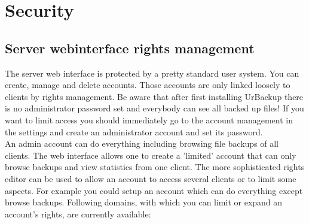 \documentclass[a4paper,10pt]{article}
\begin{document}
\section{Security}
\label{sec_security}

\subsection{Server webinterface rights management}

The server web interface is protected by a pretty standard user system. You can
create, manage and delete accounts. Those accounts are only linked loosely to
clients by rights management. Be aware that after first installing UrBackup
there is no administrator password set and everybody can see all backed up files!
If you want to limit access you should immediately go to the account management
in the settings and create an administrator account and set its password.\\
An admin account can do everything including browsing file backups of all
clients. The web interface allows one to create a 'limited' account that can only
browse backups and view statistics from one client. The more sophisticated
rights editor can be used to allow an account to access several clients or to
limit some aspects. For example you could setup an account which can do
everything except browse backups.
Following domains, with which you can limit or expand an account's rights, are
currently available:
\end{document}
